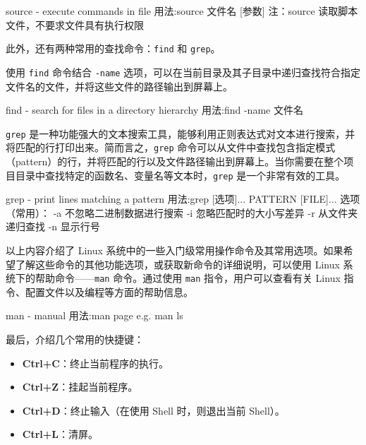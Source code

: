 \begin{CodeBlock}[language=BookShell]
source - execute commands in file
用法:source 文件名 [参数]
注：source 读取脚本文件，不要求文件具有执行权限
\end{CodeBlock}

此外，还有两种常用的查找命令：\texttt{find} 和 \texttt{grep}。

使用 \texttt{find} 命令结合 \texttt{-name} 选项，可以在当前目录及其子目录中递归查找符合指定文件名的文件，并将这些文件的路径输出到屏幕上。

\begin{CodeBlock}[language=BookShell]
find - search for files in a directory hierarchy
用法:find -name 文件名
\end{CodeBlock}

\texttt{grep} 是一种功能强大的文本搜索工具，能够利用正则表达式对文本进行搜索，并将匹配的行打印出来。简而言之，\texttt{grep} 命令可以从文件中查找包含指定模式（pattern）的行，并将匹配的行以及文件路径输出到屏幕上。当你需要在整个项目目录中查找特定的函数名、变量名等文本时，\texttt{grep} 是一个非常有效的工具。

\begin{CodeBlock}[language=BookShell]
grep - print lines matching a pattern
用法:grep [选项]... PATTERN [FILE]...
选项（常用）：
	-a 不忽略二进制数据进行搜索
	-i 忽略匹配时的大小写差异
	-r 从文件夹递归查找
	-n 显示行号
\end{CodeBlock}

以上内容介绍了 Linux 系统中的一些入门级常用操作命令及其常用选项。如果希望了解这些命令的其他功能选项，或获取新命令的详细说明，可以使用 Linux 系统下的帮助命令------\texttt{man} 命令。通过使用 \texttt{man} 指令，用户可以查看有关 Linux 指令、配置文件以及编程等方面的帮助信息。

\begin{CodeBlock}[language=BookShell]
man - manual
用法:man page
e.g.
	man ls
\end{CodeBlock}

最后，介绍几个常用的快捷键：

\begin{itemize}
\tightlist
\item
  \textbf{Ctrl+C}：终止当前程序的执行。
\item
  \textbf{Ctrl+Z}：挂起当前程序。
\item
  \textbf{Ctrl+D}：终止输入（在使用 Shell 时，则退出当前 Shell）。
\item
  \textbf{Ctrl+L}：清屏。
\end{itemize}


